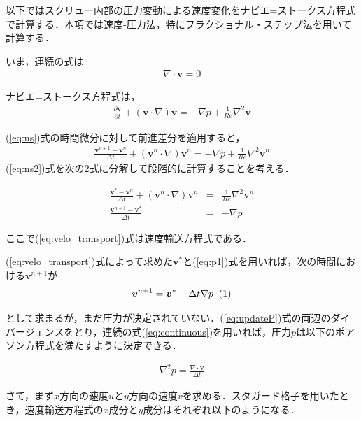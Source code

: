 \documentclass[twocolumn,oneside,a4paper]{article}
\newcommand\inlineeqno{\stepcounter{equation}\ (\theequation)}
\begin{document}
以下ではスクリュー内部の圧力変動による速度変化をナビエ=ストークス方程式で計算する．本項では速度-圧力法，特にフラクショナル・ステップ法\cite{nagare,ranryu}を用いて計算する．

いま，連続の式は
\begin{eqnarray}\label{eq:continuous}
     \nabla \cdot \bm{v} = 0
\end{eqnarray}

ナビエ=ストークス方程式は，
\begin{eqnarray}\label{eq:ns}
     \frac{\partial \bm{v}}{\partial t} + (\bm{v}\cdot \nabla)\bm{v} = -\nabla p + \frac{1}{Re} \nabla^2 \bm{v}
\end{eqnarray}

(\ref{eq:ns})式の時間微分に対して前進差分を適用すると，
\begin{eqnarray}\label{eq:ns2}
     \frac{\bm{v}^{n+1}-\bm{v}^n}{\Delta t} + (\bm{v}^n \cdot \nabla )\bm{v}^n = - \nabla p + \frac{1}{Re} \nabla^2 \bm{v}^n
\end{eqnarray}
(\ref{eq:ns2})式を次の2式に分解して段階的に計算することを考える．

\begin{eqnarray}
     \frac{\bm{v}^{\ast}-\bm{v}^n}{\Delta t} + (\bm{v}^n \cdot \nabla )\bm{v}^n &=& \frac{1}{Re} \nabla^2 \bm{v}^n \label{eq:velo_transport}\\
     \frac{\bm{v}^{n+1}-\bm{v}^{\ast}}{\Delta t} &=& - \nabla p     \label{eq:p1}
\end{eqnarray}

ここで(\ref{eq:velo_transport})式は速度輸送方程式である．

(\ref{eq:velo_transport})式によって求めた$\bm{v}^\ast$と(\ref{eq:p1})式を用いれば，次の時間における$\bm{v}^{n+1}$が
\begin{eqnarray}
\bm{v}^{n+1}=\bm{v}^{\ast}-\Delta t \nabla p \: \inlineeqno \label{eq:updateP}    
\end{eqnarray}

として求まるが，まだ圧力が決定されていない．(\ref{eq:updateP})式の両辺のダイバージェンスをとり，連続の式(\ref{eq:continuous})を用いれば，圧力$p$は以下のポアソン方程式を満たすように決定できる．

\begin{eqnarray}\label{eq:poisson}
     \nabla^2 p = \frac{\nabla \cdot \bm{v}}{\Delta t}
\end{eqnarray}


さて，まず$x$方向の速度$u$と$y$方向の速度$v$を求める．スタガード格子を用いたとき，速度輸送方程式の$x$成分と$y$成分はそれぞれ以下のようになる．
\end{document}
